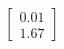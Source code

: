 \documentclass[preview]{standalone}
\begin{document}
\begin{align*}
\begin{bmatrix} 0.01 \\ 1.67 \end{bmatrix}
\end{align*}
\end{document}
